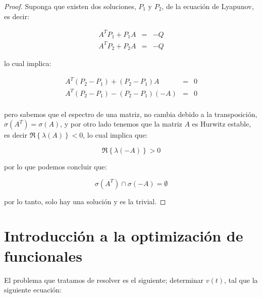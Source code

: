         \begin{proof}
            Suponga que existen dos soluciones, $P_1$ y $P_2$, de la ecuación de Lyapunov, es decir:

            \begin{eqnarray*}
                A^T P_1 + P_1 A & = & -Q \\
                A^T P_2 + P_2 A & = & -Q
            \end{eqnarray*}

            lo cual implica:

            \begin{eqnarray*}
                A^T (P_2 - P_1) + (P_2 - P_1) A & = & 0 \\
                A^T (P_2 - P_1) - (P_2 - P_1) (-A) & = & 0 \\
            \end{eqnarray*}

            pero sabemos que el espectro de una matriz, no cambia debido a la transposición, $\sigma(A^T) = \sigma(A)$, y por otro lado tenemos que la matriz $A$ es Hurwitz estable, es decir $\Re{\left\{ \lambda(A)\right\}} < 0$, lo cual implica que:

            \begin{equation*}
                \Re{\left\{ \lambda(-A) \right\}} > 0
            \end{equation*}

            por lo que podemos concluir que:

            \begin{equation*}
                \sigma(A^T) \cap \sigma(-A) = \emptyset
            \end{equation*}

            por lo tanto, solo hay una solución y es la trivial.
        \end{proof}


    \newpage
    \section{Introducción a la optimización de funcionales}

        El problema que tratamos de resolver es el siguiente; determinar $v(t)$, tal que la siguiente ecuación:

